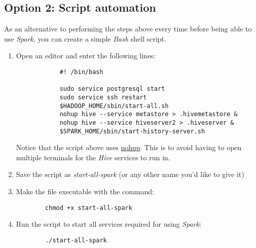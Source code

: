 \documentclass{article}
\begin{document}
    \subsection{Option 2: Script automation}
    As an alternative to performing the steps above every time before being able to use \emph{Spark},
    you can create a simple \emph{Bash} shell script.
    \begin{enumerate}
    \item Open an editor and enter the following lines:
        \begin{verbatim}
            #! /bin/bash

            sudo service postgresql start
            sudo service ssh restart
            $HADOOP_HOME/sbin/start-all.sh
            nohup hive --service metastore > .hivemetastore &
            nohup hive --service hiveserver2 > .hiveserver &
            $SPARK_HOME/sbin/start-history-server.sh  
        \end{verbatim}
    Notice that the script above uses \href{https://en.wikipedia.org/wiki/Nohup}{nohup}. This is to
    avoid having to open multiple terminals for the \emph{Hive} services to run in.
    
    \item Save the script as \emph{start-all-spark} (or any other name you'd like to give it)

    \item Make the file executable with the command:
    \begin{verbatim}
        chmod +x start-all-spark
    \end{verbatim}

    \item Run the script to start all services required for using \emph{Spark}:
    \begin{verbatim}
        ./start-all-spark
    \end{verbatim}
\end{enumerate}
\end{document}
